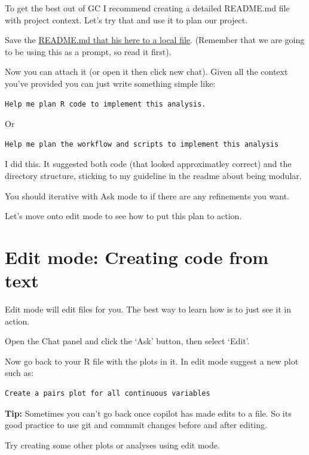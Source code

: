 \documentclass[
  letterpaper,
  DIV=11,
  numbers=noendperiod]{scrreprt}
\begin{document}
To get the best out of GC I recommend creating a detailed README.md file
with project context. Let's try that and use it to plan our project.

Save the
\href{https://github.com/cbrown5/R-llm-workshop/tree/main/resources/benthic-analysis}{README.md
that his here to a local file}. (Remember that we are going to be using
this as a prompt, so read it first).

Now you can attach it (or open it then click new chat). Given all the
context you've provided you can just write something simple like:

\begin{verbatim}
Help me plan R code to implement this analysis. 
\end{verbatim}

Or

\begin{verbatim}
Help me plan the workflow and scripts to implement this analysis
\end{verbatim}

I did this. It suggested both code (that looked approximatley correct)
and the directory structure, sticking to my guideline in the readme
about being modular.

You should iterative with Ask mode to if there are any refinements you
want.

Let's move onto edit mode to see how to put this plan to action.

\section{Edit mode: Creating code from
text}\label{edit-mode-creating-code-from-text}

Edit mode will edit files for you. The best way to learn how is to just
see it in action.

Open the Chat panel and click the `Ask' button, then select `Edit'.

Now go back to your R file with the plots in it. In edit mode suggest a
new plot such as:

\begin{verbatim}
Create a pairs plot for all continuous variables 
\end{verbatim}

\textbf{Tip:} Sometimes you can't go back once copilot has made edits to
a file. So its good practice to use git and commmit changes before and
after editing.

Try creating some other plots or analyses using edit mode.
\end{document}
